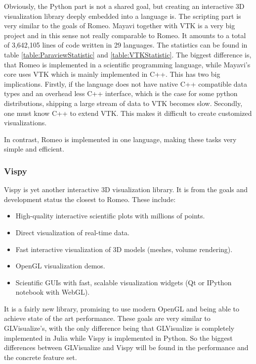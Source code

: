 Obviously, the Python part is not a shared goal, but creating an interactive 3D visualization library deeply embedded into a language is. The scripting part is very similar to the goals of Romeo.
Mayavi together with VTK is a very big project and in this sense not really comparable to Romeo.
It amounts to a total of 3,642,105 lines of code written in 29 languages. The statistics can be found in table \ref{table:ParaviewStatistic} and \ref{table:VTKStatistic}.
The biggest difference is, that Romeo is implemented in a scientific programming language, while Mayavi's core uses VTK which is mainly implemented in C++.
This has two big implications.
Firstly, if the language does not have native C++ compatible data types and an overhead less C++ interface, which is the case for some python distributions, shipping a large stream of data to VTK becomes slow.
Secondly, one must know C++ to extend VTK. This makes it difficult to create customized visualizations.

In contrast, Romeo is implemented in one language, making these tasks very simple and efficient.


\subsubsection{Vispy}

Vispy is yet another interactive 3D visualization library. It is from the goals and development status the closest to Romeo.
These include\cite{VispyGoals}:

\begin{itemize}
	\item High-quality interactive scientific plots with millions of points.
	\item Direct visualization of real-time data.
	\item Fast interactive visualization of 3D models (meshes, volume rendering).
	\item OpenGL visualization demos.
	\item Scientific GUIs with fast, scalable visualization widgets (Qt or IPython notebook with \ac{WebGL}).
\end{itemize}

It is a fairly new library, promising to use modern OpenGL and being able to achieve state of the art performance.
These goals are very similar to GLVisualize's, with the only difference being that GLVisualize is completely implemented in Julia while Vispy is implemented in Python.
So the biggest differences between GLVisualize and Vispy will be found in the performance and the concrete feature set.
